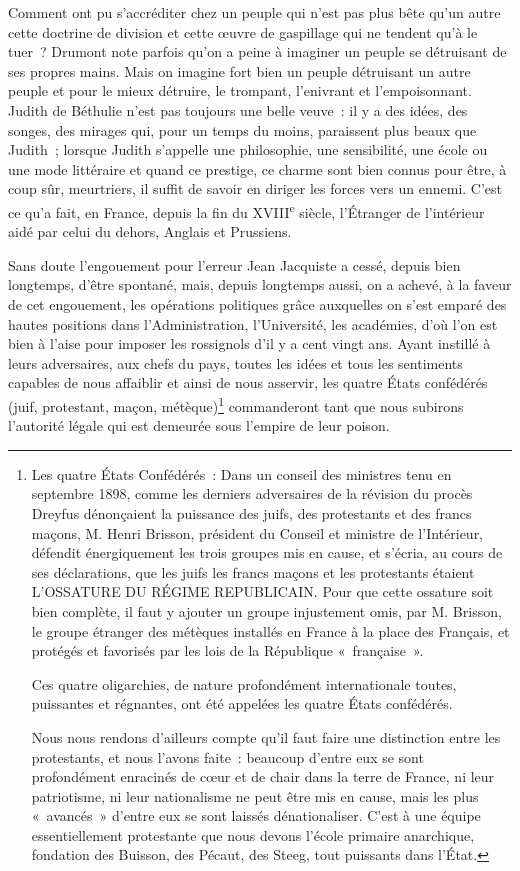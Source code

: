 \documentclass[french,twoside]{book} %
\begin{document}
\noindent Comment ont pu s’accréditer chez un peuple qui n’est pas plus bête qu’un autre cette doctrine de division et cette œuvre de gaspillage qui ne tendent qu’à le tuer ? Drumont note parfois qu’on a peine à imaginer un peuple se détruisant de ses propres mains. Mais on imagine fort bien un peuple détruisant un autre peuple et pour le mieux détruire, le trompant, l’enivrant et l’empoisonnant. Judith de Béthulie n’est pas toujours une belle veuve : il y a des idées, des songes, des mirages qui, pour un temps du moins, paraissent plus beaux que Judith ; lorsque Judith s’appelle une philosophie, une sensibilité, une école ou une mode littéraire et quand ce prestige, ce charme sont bien connus pour être, à coup sûr, meurtriers, il suffit de savoir en diriger les forces vers un ennemi. C’est ce qu’a fait, en France, depuis la fin du XVIII\textsuperscript{e} siècle, l’Étranger de l’intérieur aidé par celui du dehors, Anglais et Prussiens.\par
Sans doute l’engouement pour l’erreur Jean Jacquiste a cessé, depuis bien longtemps, d’être spontané, mais, depuis longtemps aussi, on a achevé, à la faveur de cet engouement, les opérations politiques grâce auxquelles on s’est emparé des hautes positions dans l’Administration, l’Université, les académies, d’où l’on est bien à l’aise pour imposer les rossignols d’il y a cent vingt ans. Ayant instillé à leurs adversaires, aux chefs du pays, toutes les idées et tous les sentiments capables de nous affaiblir et ainsi de nous asservir, les quatre États confédérés (juif, protestant, maçon, métèque)\footnote{ \noindent Les quatre États Confédérés : Dans un conseil des ministres tenu en septembre 1898, comme les derniers adversaires de la révision du procès Dreyfus dénonçaient la puissance des juifs, des protestants et des francs maçons, M. Henri Brisson, président du Conseil et ministre de l’Intérieur, défendit énergiquement les trois groupes mis en cause, et s’écria, au cours de ses déclarations, que les juifs les francs maçons et les protestants étaient L’OSSATURE DU RÉGIME REPUBLICAIN. Pour que cette ossature soit bien complète, il faut y ajouter un groupe injustement omis, par M. Brisson, le groupe étranger des métèques installés en France à la place des Français, et protégés et favorisés par les lois de la République « française ».\par
 Ces quatre oligarchies, de nature profondément internationale toutes, puissantes et régnantes, ont été appelées les quatre États confédérés.\par
 Nous nous rendons d’ailleurs compte qu’il faut faire une distinction entre les protestants, et nous l’avons faite : beaucoup d’entre eux se sont profondément enracinés de cœur et de chair dans la terre de France, ni leur patriotisme, ni leur nationalisme ne peut être mis en cause, mais les plus « avancés » d’entre eux se sont laissés dénationaliser. C’est à une équipe essentiellement protestante que nous devons l’école primaire anarchique, fondation des Buisson, des Pécaut, des Steeg, tout puissants dans l’État.
} commanderont tant que nous subirons l’autorité légale qui est demeurée sous l’empire de leur poison.\par
\end{document}
